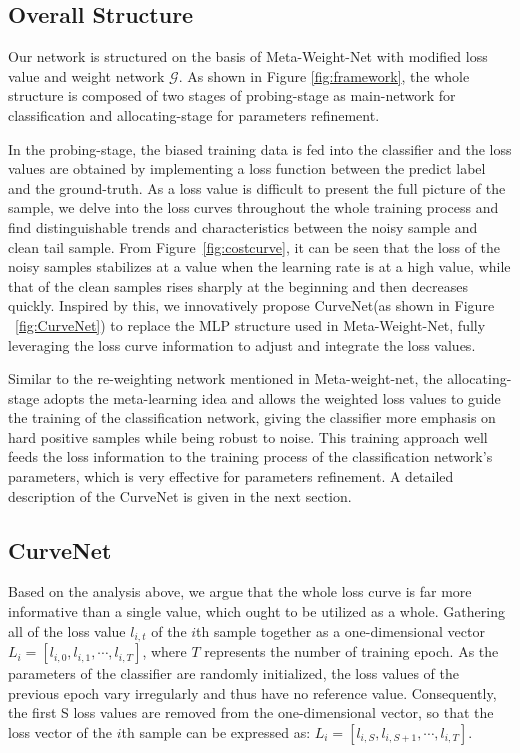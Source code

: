\documentclass[letterpaper]{article} %
\begin{document}
\subsection{Overall Structure} \label{sec:os}
Our network is structured on the basis of Meta-Weight-Net\cite{shu2019meta} with modified loss value and weight network $\mathcal{G}$. As shown in Figure \ref{fig:framework}, the whole structure is composed of two stages of probing-stage as main-network for classification and allocating-stage for parameters refinement. 

In the probing-stage, the biased training data is fed into the classifier and the loss values are obtained by implementing a loss function between the predict label and the ground-truth. 
As a loss value is difficult to present the full picture of the sample, we delve into the loss curves throughout the whole training process and find distinguishable trends and characteristics between the noisy sample and clean tail sample. 
From Figure~\ref{fig:costcurve}, it can be seen that the loss of the noisy samples stabilizes at a value when the learning rate is at a high value, while that of the clean samples rises sharply at the beginning and then decreases quickly.
Inspired by this, we innovatively propose CurveNet(as shown in Figure ~\ref{fig:CurveNet}) to replace the MLP structure used in Meta-Weight-Net\cite{shu2019meta}, fully leveraging the loss curve information to adjust and integrate the loss values. 

Similar to the re-weighting network mentioned in Meta-weight-net, the allocating-stage adopts the meta-learning idea and allows the weighted loss values to guide the training of the classification network, giving the classifier more emphasis on hard positive samples while being robust to noise. 
This training approach well feeds the loss information to the training process of the classification network's parameters, which is very effective for parameters refinement. 
A detailed description of the CurveNet is given in the next section.

\subsection{CurveNet}


Based on the analysis above, we argue that the whole loss curve is far more informative than a single value, which ought to be utilized as a whole. 
Gathering all of the loss value $l_{i,t}$ of the $i$th sample together as a one-dimensional vector $L_i=[l_{i,0}, l_{i,1}, \cdots, l_{i,T}]$, where $T$ represents the number of training epoch. 
As the parameters of the classifier are randomly initialized, the loss values of the previous epoch vary irregularly and thus have no reference value. 
Consequently, the first S loss values are removed from the one-dimensional vector, so that the loss vector of the $i$th sample can be expressed as: $L_i=[l_{i,S}, l_{i,S+1}, \cdots, l_{i,T}]$. 
\end{document}
